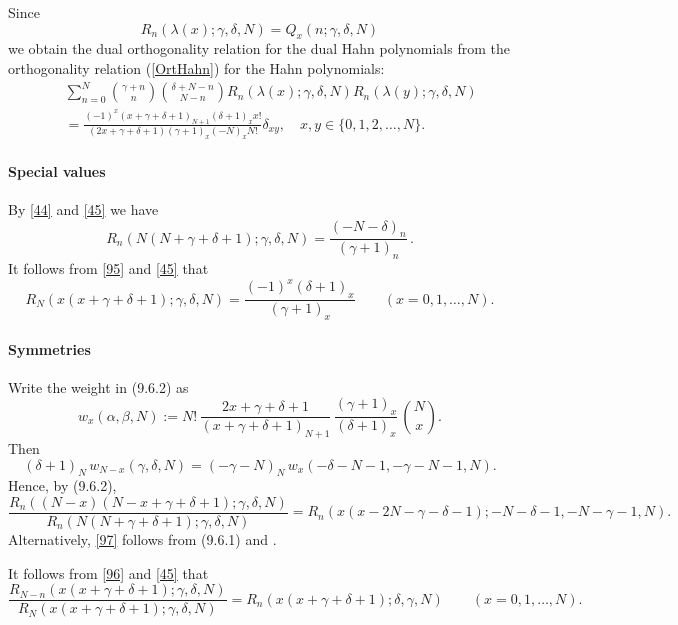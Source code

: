 \documentclass[envcountchap,graybox]{svmono}
\newcounter{rom}
\newcommand\al\alpha
\newcommand\be\beta
\newcommand\ga\gamma
\newcommand\de\delta
\begin{document}
\noindent
Since
$$R_n(\lambda(x);\gamma,\delta,N)=Q_x(n;\gamma,\delta,N)$$
we obtain the dual orthogonality relation for the dual Hahn polynomials
from the orthogonality relation (\ref{OrtHahn}) for the Hahn polynomials:
\begin{eqnarray*}
& &\sum_{n=0}^N\binom{\gamma+n}{n}\binom{\delta+N-n}{N-n} R_n(\lambda(x);\gamma,\delta,N)R_n(\lambda(y);\gamma,\delta,N)\\
& &{}=\frac{(-1)^x(x+\gamma+\delta+1)_{N+1}(\delta+1)_xx!}
{(2x+\gamma+\delta+1)(\gamma+1)_x(-N)_xN!}\delta_{xy},\quad x,y \in \{0,1,2,\ldots,N\}.
\end{eqnarray*}
\label{sec9.6}
%
\paragraph{Special values}
By \eqref{44} and \eqref{45} we have
\begin{equation}
R_n(N(N+\ga+\de+1);\ga,\de,N)=\frac{(-N-\de)_n}{(\ga+1)_n}\,.
\label{47}
\end{equation}
It follows from \eqref{95} and \eqref{45} that
\begin{equation}
R_N(x(x+\ga+\de+1);\ga,\de,N)
=\frac{(-1)^x(\de+1)_x}{(\ga+1)_x}\qquad(x=0,1,\ldots,N).
\label{101}
\end{equation}
%
\paragraph{Symmetries}
Write the weight in (9.6.2) as
\begin{equation}
w_x(\al,\be,N):=N!\,\frac{2x+\ga+\de+1}{(x+\ga+\de+1)_{N+1}}\,
\frac{(\ga+1)_x}{(\de+1)_x}\,\binom Nx.
\label{98}
\end{equation}
Then
\begin{equation}
(\de+1)_N\,w_{N-x}(\ga,\de,N)=
(-\ga-N)_N\,w_x(-\de-N-1,-\ga-N-1,N).
\label{99}
\end{equation}
Hence, by (9.6.2),
\begin{equation}
\frac{R_n((N-x)(N-x+\ga+\de+1);\ga,\de,N)}{R_n(N(N+\ga+\de+1);\ga,\de,N)}
=R_n(x(x-2N-\ga-\de-1);-N-\de-1,-N-\ga-1,N).
\label{97}
\end{equation}
Alternatively, \eqref{97} follows from (9.6.1) and
.

It follows from \eqref{96} and \eqref{45} that
\begin{equation}
\frac{R_{N-n}(x(x+\ga+\de+1);\ga,\de,N)}
{R_N(x(x+\ga+\de+1);\ga,\de,N)}
=R_n(x(x+\ga+\de+1);\de,\ga,N)\qquad(x=0,1,\ldots,N).
\label{102}
\end{equation}
%
\end{document}
